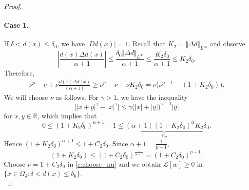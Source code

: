 \documentclass[12pt,reqno]{amsart}
\numberwithin{figure}{section}
\theoremstyle{plain}
\theoremstyle{remark}
\numberwithin{equation}{section}
\begin{document}
\begin{proof}
\paragraph{\textbf{Case 1.}} If $\delta< d(x)\leq \delta_0$, we have $|D d(x)| = 1$. Recall that $K_2= \Vert \Delta d\Vert_{L^\infty}$ and observe
\begin{equation*}
    \left|\frac{d(x)\Delta d(x)}{\alpha+1}\right| \leq \frac{\delta_0\Vert \Delta d\Vert_{L^\infty}}{\alpha+1} \leq \frac{K_2\delta_0}{\alpha+1}\leq K_2\delta_0.
\end{equation*}
Therefore,
\begin{equation}\label{e:choose_nu}
    \begin{split}
        \nu^p-\nu +\nu\frac{d(x) \Delta d(x)}{(\alpha+1)} \geq \nu^p - \nu - \nu K_2\delta_0 = \nu\Big(\nu^{p-1} - (1+K_2\delta_0)\Big).
    \end{split}
\end{equation}
We will choose $\nu$ as follows. For $\gamma>1$, we have the inequality
\begin{equation}\label{e:ineq}
    \Big||x+y|^\gamma - |x|^\gamma\Big|\leq \gamma\Big(|x|+|y|\Big)^{\gamma-1}|y|
\end{equation}
for $x,y\in \mathbb{R}$, which implies that
\begin{equation*}
     0 \leq (1+K_2\delta_0)^{\alpha+1} - 1 \leq\underbrace{(\alpha+1)\left(1+K_2\delta_0\right)^\alpha K_2}_{C_2}\delta_0.
\end{equation*}
Hence $(1+K_2\delta_0)^{\alpha+1} \leq 1 + C_2\delta_0$. Since $\alpha+1 = \frac{1}{p-1}$,
\begin{equation}\label{e:cru1}
    (1+K_2\delta_0) \leq (1+C_2\delta_0)^{\frac{1}{\alpha+1}} = (1+C_2\delta_0)^{p-1}. 
\end{equation}
Choose $\nu = 1+C_2\delta_0$ in \eqref{e:choose_nu} and we obtain $\mathcal{L}[w]\geq 0$ in $\{x\in \Omega_\delta: \delta <d(x)\leq \delta_0\}$. \\


\end{proof}
\end{document}
